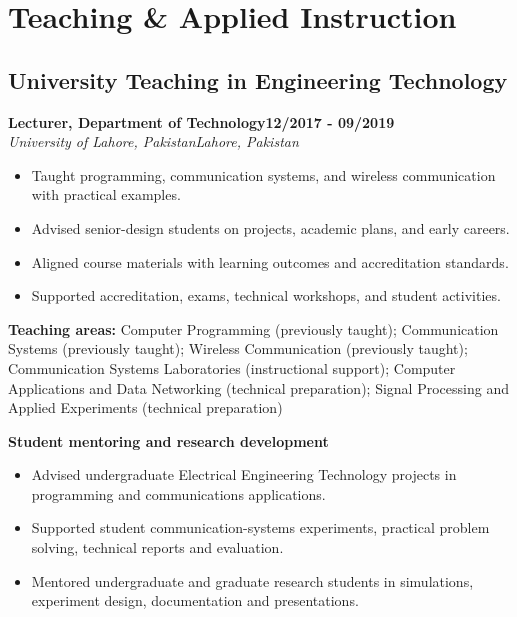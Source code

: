 \documentclass[9pt,letterpaper]{extarticle}
\newcommand{\role}[4]{%
  \Needspace{4\baselineskip}\textbf{#1}\hfill\textbf{#2}\\[-1pt]
  \textit{#3}\hfill\textit{#4}\par}
\begin{document}
\section{Teaching \& Applied Instruction}
\subsection{University Teaching in Engineering Technology}
\role{Lecturer, Department of Technology}{12/2017 - 09/2019}{University of Lahore, Pakistan}{Lahore, Pakistan}
\begin{itemize}
\item Taught programming, communication systems, and wireless communication with practical examples.
\item Advised senior-design students on projects, academic plans, and early careers.
\item Aligned course materials with learning outcomes and accreditation standards.
\item Supported accreditation, exams, technical workshops, and student activities.
\end{itemize}
\vspace{1pt}
{\small\textbf{Teaching areas:} Computer Programming (previously taught); Communication Systems (previously taught); Wireless Communication (previously taught); Communication Systems Laboratories (instructional support); Computer Applications and Data Networking (technical preparation); Signal Processing and Applied Experiments (technical preparation)}\par
{}\noindent\textbf{Student mentoring and research development}\par
\begin{itemize}
\item Advised undergraduate Electrical Engineering Technology projects in programming and communications applications.
\item Supported student communication-systems experiments, practical problem solving, technical reports and evaluation.
\item Mentored undergraduate and graduate research students in simulations, experiment design, documentation and presentations.
\end{itemize}
\end{document}
